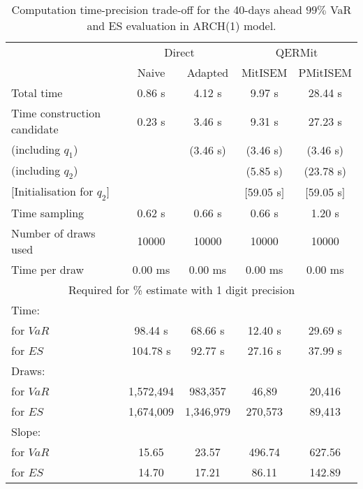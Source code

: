 { \renewcommand{\arraystretch}{1.3} 
\begin{table}[h] 
\centering 
\caption{Computation time-precision trade-off for the 40-days ahead  $99\%$ VaR and ES evaluation in ARCH(1) model.} 
\label{tab:time_precision_arch} 
\begin{tabular}{lcccc}  
  & \multicolumn{2}{c}{Direct} & \multicolumn{2}{c}{QERMit}  \\ \cline{2-5} 
  & Naive & Adapted & MitISEM & PMitISEM  \\ \hline 
Total time & 0.86 s & 4.12 s & 9.97 s & 28.44 s \\ 
Time construction candidate & 0.23 s & 3.46 s & 9.31 s & 27.23 s \\ 
 (including $q_{1}$) &   &  (3.46 s) & (3.46 s) & (3.46 s) \\ 
 (including $q_{2}$) &   &  & (5.85 s) & (23.78 s) \\ 
$[$Initialisation for $q_{2}$$]$&   &   & $[$59.05 s$]$ & $[$59.05 s$]$ \\ 
Time sampling & 0.62 s & 0.66 s & 0.66 s & 1.20 s  \\  
Number of draws used & 10000 & 10000 & 10000 & 10000 \\ 
Time per draw & 0.00 ms & 0.00 ms & 0.00 ms & 0.00 ms \\ \hline 
\multicolumn{5}{c}{Required for \% estimate with 1 digit precision} \\ \hline 
Time: &  &  &   &  \\ 
\hspace{1cm} for $VaR$ & 98.44 s & 68.66 s & 12.40 s & 29.69 s \\ 
\hspace{1cm} for $ES$ & 104.78 s & 92.77 s & 27.16 s & 37.99 s \\ 
Draws: &  &  &   &  \\ 
\hspace{1cm} for $VaR$ & 1,572,494 & 983,357  & 46,89  & 20,416  \\ 
\hspace{1cm} for $ES$ & 1,674,009 & 1,346,979  & 270,573   & 89,413  \\ 
\hline 
Slope: &  &  &   &  \\ 
\hspace{1cm} for $VaR$ & 15.65 & 23.57  & 496.74  & 627.56  \\ 
\hspace{1cm} for $ES$ & 14.70 & 17.21  & 86.11   & 142.89  \\  \hline 
\end{tabular} 
\end{table} 
} 
